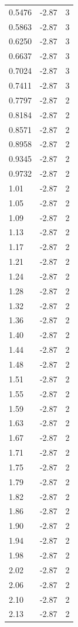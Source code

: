 \begin{longtable}{lrr}
  0.5476 & -2.87 & 3 \\
  0.5863 & -2.87 & 3 \\
  0.6250 & -2.87 & 3 \\
  0.6637 & -2.87 & 3 \\
  0.7024 & -2.87 & 3 \\
  0.7411 & -2.87 & 3 \\
  0.7797 & -2.87 & 2 \\
  0.8184 & -2.87 & 2 \\
  0.8571 & -2.87 & 2 \\
  0.8958 & -2.87 & 2 \\
  0.9345 & -2.87 & 2 \\
  0.9732 & -2.87 & 2 \\
  1.01 & -2.87 & 2 \\
  1.05 & -2.87 & 2 \\
  1.09 & -2.87 & 2 \\
  1.13 & -2.87 & 2 \\
  1.17 & -2.87 & 2 \\
  1.21 & -2.87 & 2 \\
  1.24 & -2.87 & 2 \\
  1.28 & -2.87 & 2 \\
  1.32 & -2.87 & 2 \\
  1.36 & -2.87 & 2 \\
  1.40 & -2.87 & 2 \\
  1.44 & -2.87 & 2 \\
  1.48 & -2.87 & 2 \\
  1.51 & -2.87 & 2 \\
  1.55 & -2.87 & 2 \\
  1.59 & -2.87 & 2 \\
  1.63 & -2.87 & 2 \\
  1.67 & -2.87 & 2 \\
  1.71 & -2.87 & 2 \\
  1.75 & -2.87 & 2 \\
  1.79 & -2.87 & 2 \\
  1.82 & -2.87 & 2 \\
  1.86 & -2.87 & 2 \\
  1.90 & -2.87 & 2 \\
  1.94 & -2.87 & 2 \\
  1.98 & -2.87 & 2 \\
  2.02 & -2.87 & 2 \\
  2.06 & -2.87 & 2 \\
  2.10 & -2.87 & 2 \\
  2.13 & -2.87 & 2 \\

\end{longtable}

